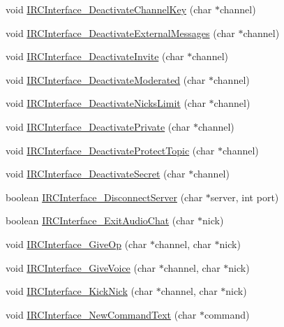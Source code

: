 \begin{DoxyCompactItemize}
\item 
void \hyperlink{_g-2301-05-_p2-xchat2_8c_a3e67ee0cd384b524d57fda14593dce8e}{I\-R\-C\-Interface\-\_\-\-Deactivate\-Channel\-Key} (char $\ast$channel)
\item 
void \hyperlink{_g-2301-05-_p2-xchat2_8c_a638b1535f4ecbc9a6affb2df2a6a946e}{I\-R\-C\-Interface\-\_\-\-Deactivate\-External\-Messages} (char $\ast$channel)
\item 
void \hyperlink{_g-2301-05-_p2-xchat2_8c_a9ba4e98a3729737aa63ebec54ba4e894}{I\-R\-C\-Interface\-\_\-\-Deactivate\-Invite} (char $\ast$channel)
\item 
void \hyperlink{_g-2301-05-_p2-xchat2_8c_ab760e8144b38f6c14bd809d157cee5d4}{I\-R\-C\-Interface\-\_\-\-Deactivate\-Moderated} (char $\ast$channel)
\item 
void \hyperlink{_g-2301-05-_p2-xchat2_8c_a92c8cfbe2e14e19277e1c97d11719e80}{I\-R\-C\-Interface\-\_\-\-Deactivate\-Nicks\-Limit} (char $\ast$channel)
\item 
void \hyperlink{_g-2301-05-_p2-xchat2_8c_a8a6141803691ba327f11ba763ad075d4}{I\-R\-C\-Interface\-\_\-\-Deactivate\-Private} (char $\ast$channel)
\item 
void \hyperlink{_g-2301-05-_p2-xchat2_8c_a5a57541a950f8c2c40b4b44c32b28ed9}{I\-R\-C\-Interface\-\_\-\-Deactivate\-Protect\-Topic} (char $\ast$channel)
\item 
void \hyperlink{_g-2301-05-_p2-xchat2_8c_a4956427664cabc7d5b2bd1589a207324}{I\-R\-C\-Interface\-\_\-\-Deactivate\-Secret} (char $\ast$channel)
\item 
boolean \hyperlink{_g-2301-05-_p2-xchat2_8c_a8bf0424ef7f845be79a056e9aed56fe2}{I\-R\-C\-Interface\-\_\-\-Disconnect\-Server} (char $\ast$server, int port)
\item 
boolean \hyperlink{_g-2301-05-_p2-xchat2_8c_ab431412191716f751461f94d613ffdab}{I\-R\-C\-Interface\-\_\-\-Exit\-Audio\-Chat} (char $\ast$nick)
\item 
void \hyperlink{_g-2301-05-_p2-xchat2_8c_ae075029bb55e8b995f22beb0810674f4}{I\-R\-C\-Interface\-\_\-\-Give\-Op} (char $\ast$channel, char $\ast$nick)
\item 
void \hyperlink{_g-2301-05-_p2-xchat2_8c_ae9effb4bdaf4a2cdf2dd9edbeb90b430}{I\-R\-C\-Interface\-\_\-\-Give\-Voice} (char $\ast$channel, char $\ast$nick)
\item 
void \hyperlink{_g-2301-05-_p2-xchat2_8c_a7adfea400a96160585f86179bafb055f}{I\-R\-C\-Interface\-\_\-\-Kick\-Nick} (char $\ast$channel, char $\ast$nick)
\item 
void \hyperlink{_g-2301-05-_p2-xchat2_8c_a214e10b19c8be028fb35d2a7abf3f798}{I\-R\-C\-Interface\-\_\-\-New\-Command\-Text} (char $\ast$command)

\end{DoxyCompactItemize}
